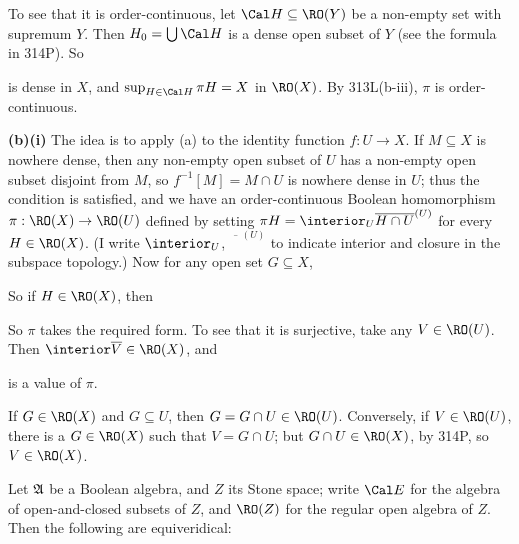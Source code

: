 {\medskip

 To see that it is order-continuous, let
$\Cal H\subseteq\RO(Y)$ be a non-empty set with supremum $Y$.   Then
$H_0=\bigcup\Cal H$ is a dense open subset of $Y$ (see the formula in
314P).   So


\noindent is dense in $X$, and $\sup_{H\in\Cal H}\pi H=X$ in $\RO(X)$.
By 313L(b-iii), $\pi$ is order-continuous.

\medskip

{\bf (b)(i)} The idea is to apply (a) to the identity function
$f:U\to X$.   If $M\subseteq X$ is nowhere dense, then any non-empty open
subset of $U$ has a non-empty open subset disjoint from $M$, so
$f^{-1}[M]=M\cap U$ is nowhere dense in $U$;  thus the condition is
satisfied, and we have an order-continuous Boolean homomorphism
$\pi:\RO(X)\to\RO(U)$ defined by setting
$\pi H=\interior_U\overline{H\cap U}^{(U)}$ for every $H\in\RO(X)$.
(I write $\interior_U$, $\overline{\phantom{H}}^{(U)}$ to indicate interior
and closure in the subspace topology.)   Now for any open set
$G\subseteq X$,


\noindent So if $H\in\RO(X)$, then


\noindent So $\pi$ takes the required form.   To see that it is surjective,
take any $V\in\RO(U)$.   Then $\interior\overline{V}\in\RO(X)$, and


\noindent is a value of $\pi$.

\medskip

If $G\in\RO(X)$ and $G\subseteq U$, then $G=G\cap U\in\RO(U)$.
Conversely, if $V\in\RO(U)$, there is a $G\in\RO(X)$ such that
$V=G\cap U$;  but $G\cap U\in\RO(X)$, by 314P, so $V\in\RO(X)$.
}%

 Let $\frak A$ be a Boolean algebra, and $Z$ its
Stone space;  write $\Cal E$ for the algebra of open-and-closed subsets
of $Z$, and $\RO(Z)$ for the regular open algebra of $Z$.   Then the
following are equiveridical:

